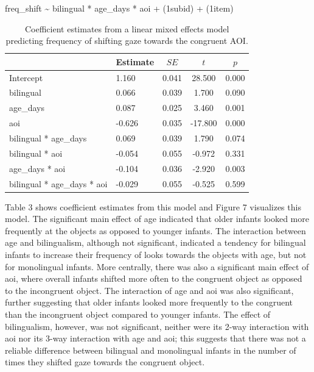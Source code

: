 \documentclass[,man,floatsintext]{apa6}
\begin{document}
freq\_shift \textasciitilde{} bilingual * age\_days * aoi +
(1\textbar{}subid) +
(1\textbar{}item)

\begin{table}[tbp]
\begin{center}
\begin{threeparttable}
\caption{\label{tab:coef_table_frequency}Coefficient estimates from a linear mixed effects model predicting frequency of shifting gaze towards the congruent AOI.}
\begin{tabular}{llccc}
\toprule
 & Estimate & $SE$ & $t$ & $p$\\
\midrule
Intercept & 1.160 & 0.041 & 28.500 & 0.000\\
bilingual & 0.066 & 0.039 & 1.700 & 0.090\\
age\_days & 0.087 & 0.025 & 3.460 & 0.001\\
aoi & -0.626 & 0.035 & -17.800 & 0.000\\
bilingual * age\_days & 0.069 & 0.039 & 1.790 & 0.074\\
bilingual * aoi & -0.054 & 0.055 & -0.972 & 0.331\\
age\_days * aoi & -0.104 & 0.036 & -2.920 & 0.003\\
bilingual * age\_days * aoi & -0.029 & 0.055 & -0.525 & 0.599\\
\bottomrule
\end{tabular}
\end{threeparttable}
\end{center}
\end{table}

\noindent Table 3 shows coefficient estimates from this model and Figure 7 visualizes this model. The significant main effect of age indicated that older infants looked more frequently at the objects as opposed to younger infants. The interaction between age and bilingualism, although not significant, indicated a tendency for bilingual infants to increase their frequency of looks towards the objects with age, but not for monolingual infants. More centrally, there was also a significant main effect of aoi, where overall infants shifted more often to the congruent object as opposed to the incongruent object. The interaction of age and aoi was also significant, further suggesting that older infants looked more frequently to the congruent than the incongruent object compared to younger infants. The effect of bilingualism, however, was not significant, neither were its 2-way interaction with aoi nor its 3-way interaction with age and aoi; this suggests that there was not a reliable difference between bilingual and monolingual infants in the number of times they shifted gaze towards the congruent object.
\end{document}
